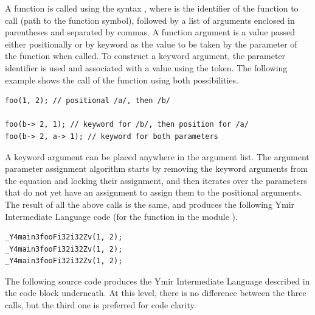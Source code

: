 A function is called using the syntax , where
 is the identifier of the function to call (path to the function
symbol), followed by a list of arguments enclosed in parentheses and separated
by commas. A function argument is a value passed either positionally or by
keyword as the value to be taken by the parameter of the function when called.
To construct a keyword argument, the parameter identifier is used and associated
with a value using the \token{->} token. The following example shows the call
of the function  using both possibilities.

\begin{lstlisting}[style=coloredverbatim]
foo(1, 2); // positional /a/, then /b/

foo(b-> 2, 1); // keyword for /b/, then position for /a/
foo(b-> 2, a-> 1); // keyword for both parameters
\end{lstlisting}

A keyword argument can be placed anywhere in the argument list. The argument
parameter assignment algorithm starts by removing the keyword arguments from the
equation and locking their assignment, and then iterates over the parameters
that do not yet have an assignment to assign them to the positional arguments.
The result of all the above calls is the same, and produces the following Ymir
Intermediate Language code (for the function  in the module
).

\begin{lstlisting}[style=lyilVerb]
_Y4main3fooFi32i32Zv(1, 2);
_Y4main3fooFi32i32Zv(1, 2);
_Y4main3fooFi32i32Zv(1, 2);
\end{lstlisting}


The following source code produces the Ymir Intermediate Language described in
the code block underneath. At this level, there is no difference between the
three calls, but the third one is preferred for code clarity.

